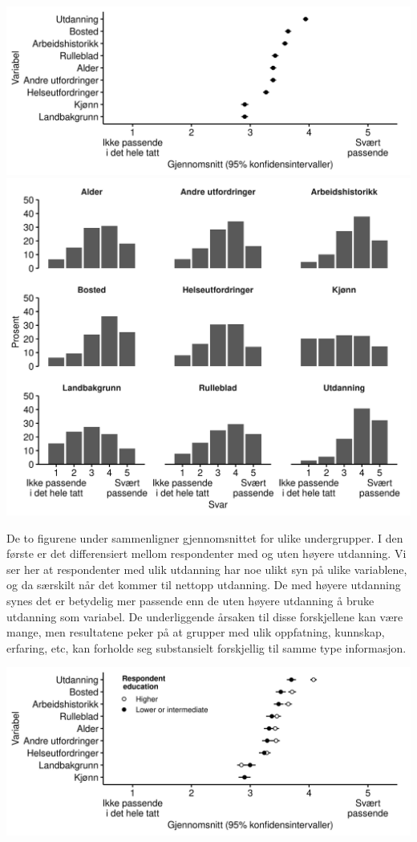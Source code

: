 \documentclass[
]{book}
\begin{document}
\includegraphics{figs/png/fig_vars_avg.png}
\includegraphics{figs/png/fig_vars_hist.png}

De to figurene under sammenligner gjennomsnittet for ulike undergrupper. I den første er det differensiert mellom respondenter med og uten høyere utdanning. Vi ser her at respondenter med ulik utdanning har noe ulikt syn på ulike variablene, og da særskilt når det kommer til nettopp utdanning. De med høyere utdanning synes det er betydelig mer passende enn de uten høyere utdanning å bruke utdanning som variabel. De underliggende årsaken til disse forskjellene kan være mange, men resultatene peker på at grupper med ulik oppfatning, kunnskap, erfaring, etc, kan forholde seg substansielt forskjellig til samme type informasjon.

\includegraphics{figs/png/fig_vars_avg_utd.png}
\end{document}
